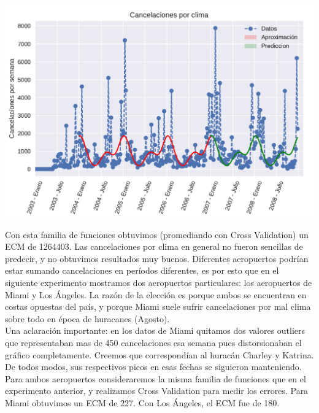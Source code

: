 {\centering
    \includegraphics[scale=0.8]{informe/imagenes/cancelacionesPorClimaGeneralPrediccionV1.pdf} \\
}

Con esta familia de funciones obtuvimos (promediando con Cross Validation) un ECM de 1264403. Las cancelaciones por clima en general no fueron sencillas de predecir, y no obtuvimos resultados muy buenos. Diferentes aeropuertos podrían estar sumando cancelaciones en períodos diferentes, es por esto que en el siguiente experimento mostramos dos aeropuertos particulares: los aeropuertos de Miami y Los Ángeles. La razón de la elección es porque ambos se encuentran en costas opuestas del país, y porque Miami suele sufrir cancelaciones por mal clima sobre todo en época de huracanes (Agosto). \\

Una aclaración importante: en los datos de Miami quitamos dos valores outliers que representaban mas de 450 cancelaciones esa semana pues distorsionaban el gráfico completamente. Creemos que correspondían al huracán Charley y Katrina. De todos modos, sus respectivos picos en esas fechas se siguieron manteniendo. \\

Para ambos aeropuertos consideraremos la misma familia de funciones que en el experimento anterior, y realizamos Cross Validation para medir los errores. Para Miami obtuvimos un ECM de 227. Con Los Ángeles, el ECM fue de 180.

